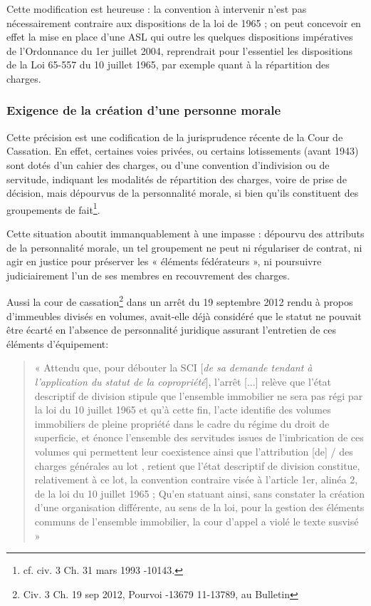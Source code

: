 			Cette modification est heureuse : la convention à intervenir n’est pas nécessairement contraire aux
			dispositions de la loi de 1965 ; on peut concevoir en effet la mise en place d’une ASL qui outre les quelques
			dispositions impératives de l’Ordonnance du 1er juillet 2004, reprendrait pour l’essentiel les dispositions
			de la Loi 65-557 du 10 juillet 1965, par exemple quant à la répartition des charges.
		
		\subsubsection{Exigence de la création d’une personne morale}
		
			Cette précision est une codification de la jurisprudence récente de la Cour de Cassation. En effet, certaines
			voies privées, ou certains lotissements (avant 1943) sont dotés d’un cahier des charges, ou d’une
			convention d’indivision ou de servitude, indiquant les modalités de répartition des charges, voire de prise
			de décision, mais dépourvus de la personnalité morale, si bien qu’ils constituent des groupements de fait\footnote{cf. civ. 3\degre{} Ch. 31 mars 1993 -10143.}.
			
			Cette situation aboutit immanquablement à une impasse : dépourvu des attributs de la personnalité
			morale, un tel groupement ne peut ni régulariser de contrat, ni agir en justice pour préserver les
			« éléments fédérateurs », ni poursuivre judiciairement l’un de ses membres en recouvrement des charges.
			
			Aussi la cour de cassation\footnote{Civ. 3\degre{} Ch. 19 sep 2012, Pourvoi -13679 11-13789, au Bulletin} dans un arrêt du 19 septembre 2012 rendu à propos d’immeubles divisés en
			volumes, avait-elle déjà considéré que le statut ne pouvait être écarté en l’absence de personnalité
			juridique assurant l’entretien de ces éléments d’équipement:
			\begin{quote}
				« Attendu que, pour débouter la SCI [\emph{de sa demande tendant à l’application du statut de la
				copropriété}], l'arrêt [$\dots$] relève que l'état descriptif de division stipule que l'ensemble immobilier ne
				sera pas régi par la loi du 10 juillet 1965 et qu'à cette fin, l'acte identifie des volumes immobiliers de
				pleine propriété dans le cadre du régime du droit de superficie, et énonce l'ensemble des servitudes
				issues de l'imbrication de ces volumes qui permettent leur coexistence ainsi que l'attribution [de]
				/\iemes{} des charges générales au lot , retient que l'état descriptif de division constitue,
				relativement à ce lot, la convention contraire visée à l'article 1er, alinéa 2, de la loi du 10 juillet 1965 ;
				Qu'en statuant ainsi, sans constater la création d'une organisation différente, au sens de la loi, pour
				la gestion des éléments communs de l'ensemble immobilier, la cour d'appel a violé le texte susvisé »
			\end{quote}
		
